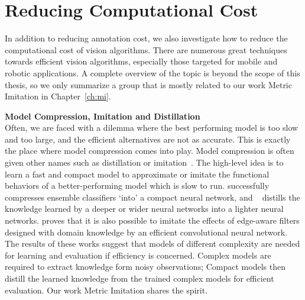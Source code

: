 \section{Reducing Computational Cost} 
In addition to reducing annotation cost, we also investigate how to reduce the computational cost of vision algorithms. There are numerous great techniques towards efficient vision algorithms, especially those targeted for mobile and robotic applications.  A complete overview of the topic is beyond the scope of this thesis, so we  only summarize a  group that is mostly related to our work Metric Imitation in Chapter~\ref{ch:mi}. 

\textbf{Model Compression, Imitation and Distillation} \\
Often, we are faced with a dilemma where the best performing model is too slow and too large, and the efficient alternatives are not as accurate. This is exactly the place where model compression \citep{model:compression} comes into play.  Model compression is often given other names such as distillation or imitation~\citep{DistillingCNN, romero2014fitnets, policy:distilling}. The high-level idea is to learn a fast and compact model to approximate or imitate the functional behaviors  of a better-performing model which is slow to run. 
\citep{model:compression} successfully compresses ensemble classifiers `into' a compact neural network, and ~\citep{DistillingCNN, romero2014fitnets, policy:distilling} distills the knowledge learned by a deeper or wider neural networks into a lighter neural networks. 
\citep{deepfilters} proves that it is also possible to imitate the effects of edge-aware filters designed with domain knowledge by an efficient convolutional neural network.  The results of these works suggest that models of different complexity are needed for learning and evaluation if efficiency is concerned.  Complex models are required to extract knowledge form noisy observations; Compact models then distill the learned knowledge from the trained complex models for efficient evaluation. Our work Metric Imitation shares the spirit.   


